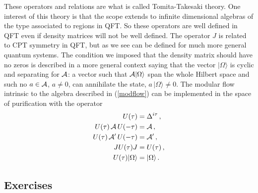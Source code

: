 \documentclass[11pt]{article}
\numberwithin{equation}{section}
\begin{document}
These operators and relations are what is called Tomita-Takesaki theory. One interest of this theory is that the scope extends to infinite dimensional algebras of the type associated to regions in QFT. So these operators are well defined in QFT even if density matrices will not be well defined. The operator $J$ is related to CPT symmetry in QFT, but as we see can be defined for much more general quantum systems. The condition we imposed that the density matrix should have no zeros is described in a more general context saying that the vector $|\Omega\rangle$ is 
 cyclic and separating for ${\cal A}$: a vector such that ${\cal A} \vert \Omega \rangle$ span the whole Hilbert space and such no $a\in {\cal A}$, $a\neq 0$,  can annihilate the state, $a\,|\Omega \rangle \neq 0$. The modular flow intrinsic to the algebra described in (\ref{modflow}) can be implemented in the space of purification with the operator  
\begin{align}
 U(\tau)&=\Delta^{i \tau}\,, \nonumber\\
 U(\tau)\,{\cal A}\, U(-\tau)&= {\cal A}\,,\nonumber\\
 U(\tau)\,{\cal A}'\, U(-\tau)&= {\cal A}'\,,\nonumber\\
 J U(\tau) J&=U(\tau)\,,\nonumber\\
  U(\tau)|\Omega \rangle &=|\Omega \rangle\,.
\end{align}

\subsection{Exercises}
\end{document}
